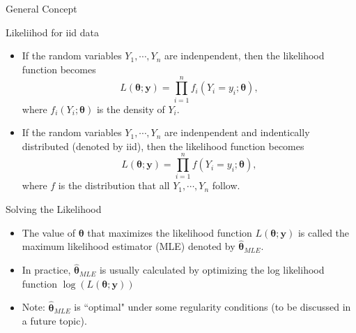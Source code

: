 \documentclass{beamer}
\begin{document}
\begin{section}{General Concept}
    \begin{frame}{Likeliihod for iid data}
        \begin{itemize}
            \item If the random variables $Y_{1}, \cdots, Y_{n}$ are indenpendent, then the likelihood function becomes 
$$L(\boldsymbol{\theta}; \mathbf{y}) = \prod^{n}_{i=1}f_{i}(Y_{i} = y_{i};\boldsymbol{\theta}),$$
where $f_{i}(Y_{i}; \boldsymbol{\theta})$ is the density of $Y_{i}.$
             \item If the  random variables $Y_{1}, \cdots, Y_{n}$ are indenpendent  and indentically distributed (denoted by iid), then the likelihood function becomes 
$$L(\boldsymbol{\theta}; \mathbf{y}) = \prod^{n}_{i=1}f(Y_{i} = y_{i};\boldsymbol{\theta}),$$
where $f$ is the distribution that all $Y_{1}, \cdots, Y_{n}$ follow.
        \end{itemize}
    \end{frame}


    \begin{frame}{Solving the Likelihood}
        \begin{itemize}
            \item The value of $\boldsymbol{\theta}$ that maximizes the likelihood function $L(\boldsymbol{\theta}; \mathbf{y})$ is called the maximum likelihood estimator (MLE) denoted by $\hat{\boldsymbol{\theta}}_{MLE}$.
            \item In practice, $\hat{\boldsymbol{\theta}}_{MLE}$ is usually calculated by optimizing the log likelihood function $\log(L(\boldsymbol{\theta}; \mathbf{y}))$
           \item Note: $\hat{\boldsymbol{\theta}}_{MLE}$  is ``optimal" under some  regularity conditions  (to be discussed in a future topic).
        \end{itemize}
    \end{frame}
 \end{section}
\end{document}

